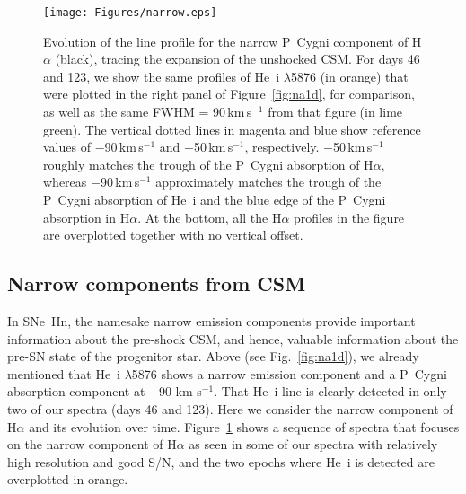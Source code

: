 \documentclass[fleqn,usenatbib,useAMS]{mnras}
\begin{document}
\begin{figure}\begin{center}
\texttt{[image: Figures/narrow.eps]}
\end{center}
\caption{Evolution of the line profile for the narrow P~Cygni
  component of H$\alpha$ (black), tracing the expansion of the
  unshocked CSM.  For days 46 and 123, we show the same profiles of
  He~{\sc i} $\lambda$5876 (in orange) that were plotted in the right
  panel of Figure~\ref{fig:na1d}, for comparison, as well as the same
  FWHM = 90\,km\,s$^{-1}$ from that figure (in lime green).  The
  vertical dotted lines in magenta and blue show reference values of
  $-$90\,km\,s$^{-1}$ and $-$50\,km\,s$^{-1}$, respectively.  $-$50\,km\,s$^{-1}$ roughly matches the trough of the P~Cygni absorption of
  H$\alpha$, whereas $-$90\,km\,s$^{-1}$ approximately matches the trough of
  the P~Cygni absorption of He~{\sc i} and the blue edge of the P~Cygni absorption in H$\alpha$.  At the bottom, all the H$\alpha$
  profiles in the figure are overplotted together with no vertical
  offset.}
\label{fig:narrow}
\end{figure}


\subsection{Narrow components from CSM}

In SNe~IIn, the namesake narrow emission components provide important
information about the pre-shock CSM, and hence, valuable information
about the pre-SN state of the progenitor star.  Above (see
Fig.~\ref{fig:na1d}), we already mentioned that 
He~{\sc i} $\lambda$5876 shows a narrow emission component and
a P~Cygni absorption component at $-$90 km s$^{-1}$.  That He~{\sc i}
line is clearly detected in only two of our spectra (days 46 and 123).
Here we consider the narrow component of H$\alpha$ and its evolution
over time.  Figure~\ref{fig:narrow} shows a sequence of spectra that
focuses on the narrow component of H$\alpha$ as seen in some of our
spectra with relatively high resolution and good S/N, and the two epochs where He~{\sc i} is detected are overplotted
in orange.
\end{document}
